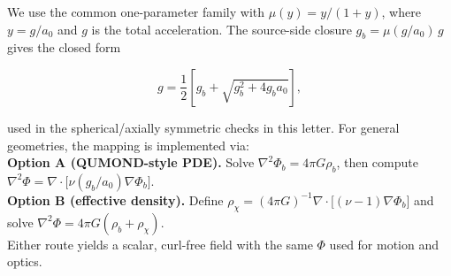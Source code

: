 \documentclass[
]{article}
\begin{document}
We use the common one-parameter family with \(\mu(y) = y/(1 + y)\),
where \(y = g/a_{0}\) and \(g\) is the total acceleration. The
source-side closure \(g_{b} = \mu(g/a_{0})\, g\) gives the closed form

\[g = \frac{1}{2}\left\lbrack g_{b} + \sqrt{g_{b}^{2} + 4g_{b}a_{0}} \right\rbrack,\]

used in the spherical/axially symmetric checks in this letter. For
general geometries, the mapping is implemented via:\\
\textbf{Option A (QUMOND-style PDE).} Solve
\(\nabla^{2}\Phi_{b} = 4\pi G\rho_{b}\), then compute
\(\nabla^{2}\Phi = \nabla \cdot \lbrack\nu(g_{b}/a_{0})\nabla\Phi_{b}\rbrack\).\\
\textbf{Option B (effective density).} Define
\(\rho_{\chi} = (4\pi G)^{- 1}\nabla \cdot \lbrack(\nu - 1)\nabla\Phi_{b}\rbrack\)
and solve \(\nabla^{2}\Phi = 4\pi G(\rho_{b} + \rho_{\chi})\).\\
Either route yields a scalar, curl-free field with the same \(\Phi\)
used for motion and optics.
\end{document}
